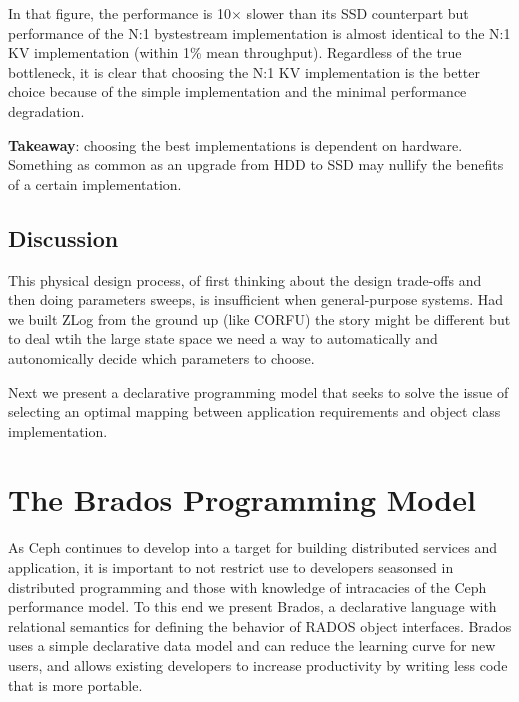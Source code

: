 \documentclass[10pt,twocolumn]{article}
\begin{document}
In that figure, the performance is 10\(\times\) slower than its SSD counterpart
but performance of the N:1 bystestream implementation is almost identical to
the N:1 KV implementation (within 1\% mean throughput). Regardless of the true
bottleneck, it is clear that choosing the N:1 KV implementation is the better
choice because of the simple implementation and the minimal performance
degradation.

\textbf{Takeaway}: choosing the best implementations is dependent on hardware.
Something as common as an upgrade from HDD to SSD may nullify the benefits of a
certain implementation. 

\subsection{Discussion}

This physical design process, of first thinking about the design trade-offs and
then doing parameters sweeps, is insufficient when general-purpose systems. Had
we built ZLog from the ground up (like CORFU) the story might be different but
to deal wtih the large state space we need a way to automatically and
autonomically decide which parameters to choose. 

Next we present a declarative programming model that seeks to solve the issue
of selecting an optimal mapping between application requirements and object
class implementation.

\section{The Brados Programming Model}

As Ceph continues to develop into a target for building distributed services
and application, it is important to not restrict use to developers seasonsed
in distributed programming and those with knowledge of intracacies of the Ceph
performance model. To this end we present Brados, a declarative language with
relational semantics for defining the behavior of RADOS object interfaces.
Brados uses a simple declarative data model and can reduce the learning curve
for new users, and allows existing developers to increase productivity by
writing less code that is more portable.
\end{document}

